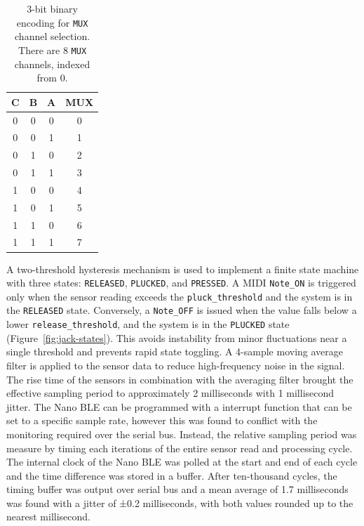 \begin{table}[]
    \centering
    {
        \ttfamily
        \begin{tabular}{|c|c|c|c|}
            \hline
            C & B & A & MUX \\ \hline
            0 & 0 & 0 & 0   \\ \hline
            0 & 0 & 1 & 1   \\ \hline
            0 & 1 & 0 & 2   \\ \hline
            0 & 1 & 1 & 3   \\ \hline
            1 & 0 & 0 & 4   \\ \hline
            1 & 0 & 1 & 5   \\ \hline
            1 & 1 & 0 & 6   \\ \hline
            1 & 1 & 1 & 7   \\ \hline
        \end{tabular}
    }
    \caption{3-bit binary encoding for \texttt{MUX} channel selection. There are 8 \texttt{MUX} channels, indexed from 0.}
    \label{tab:mux-encoding}
\end{table}



A two-threshold hysteresis mechanism is used to implement a finite state machine with three states: \texttt{RELEASED}, \texttt{PLUCKED}, and \texttt{PRESSED}. 
A MIDI \texttt{Note\_ON} is triggered only when the sensor reading exceeds the \texttt{pluck\_threshold} and the system is in the \texttt{RELEASED} state. Conversely, a \texttt{Note\_OFF} is issued when the value falls below a lower \texttt{release\_threshold}, and the system is in the \texttt{PLUCKED} state (Figure~\ref{fig:jack-states}). This avoids instability from minor fluctuations near a single threshold and prevents rapid state toggling. A 4-sample moving average filter is applied to the sensor data to reduce high-frequency noise in the signal. The rise time of the sensors in combination with the averaging filter brought the effective sampling period to approximately 2 milliseconds with 1 millisecond jitter. The Nano BLE can be programmed with a interrupt function that can be set to a specific sample rate, however this was found to conflict with the monitoring required over the serial bus. Instead, the relative sampling period was measure by timing each iterations of the entire sensor read and processing cycle. The internal clock of the Nano BLE was polled at the start and end of each cycle and the time difference was stored in a buffer.  After ten-thousand cycles, the timing buffer was output over serial bus and a mean average of 1.7 milliseconds was found with a jitter of ±0.2 milliseconds, with both values rounded up to the nearest millisecond.

